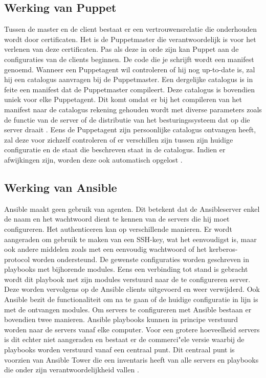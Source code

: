  \autocite{languagePuppet}\autocite{masterproef} \autocite{ansibledoc}

\subsection{Werking van Puppet}

Tussen de master en de client bestaat er een vertrouwensrelatie die onderhouden wordt door certificaten. Het is de Puppetmaster die verantwoordelijk is voor het verlenen van deze certificaten. Pas als deze in orde zijn kan Puppet  aan de configuraties van de clients beginnen. De code die je schrijft wordt een manifest genoemd. Wanneer een Puppetagent wil controleren of hij nog up-to-date is, zal hij een catalogus aanvragen bij de Puppetmaster. Een dergelijke catalogus is in feite een manifest dat de Puppetmaster compileert. Deze catalogus is bovendien uniek voor elke Puppetagent. Dit komt omdat er bij het compileren van het manifest naar de catalogus rekening gehouden wordt met diverse parameters zoals de functie van de server of de distributie van het besturingssysteem dat op die server draait \autocite{Puppetlanguagecatalog}. Eens de Puppetagent zijn persoonlijke catalogus ontvangen heeft, zal deze voor zichzelf controleren of er verschillen zijn tussen zijn huidige configuratie en de staat die beschreven staat in de catalogus. Indien er afwijkingen zijn, worden deze ook automatisch opgelost \autocite{Puppetdoc}.

\subsection{Werking van Ansible}

Ansible maakt geen gebruik van agenten. Dit betekent dat de Ansibleserver enkel de naam en het wachtwoord dient te kennen van de servers die hij moet configureren. Het authenticeren kan op verschillende manieren. Er wordt aangeraden om gebruik te maken van een SSH-key, wat het eenvoudigst is, maar ook andere middelen zoals met een eenvoudig wachtwoord of het kerberos-protocol worden ondersteund. De gewenste configuraties worden geschreven in playbooks met bijhorende modules. Eens een verbinding tot stand is gebracht wordt dit playbook met zijn modules verstuurd naar de te configureren server. Deze worden vervolgens op de Ansible clients uitgevoerd  en weer verwijderd. Ook Ansible bezit de functionaliteit om na te gaan of de huidige configuratie in lijn is met de ontvangen modules. Om servers te configureren met Ansible bestaan er bovendien twee manieren. Ansible playbooks kunnen in principe verstuurd worden naar de servers vanaf elke computer. Voor een grotere hoeveelheid servers is dit echter niet aangeraden en bestaat er de commerci"ele versie waarbij de playbooks worden verstuurd vanaf een centraal punt. Dit centraal punt is voorzien van Ansible Tower die een inventaris heeft van alle servers en playbooks die onder zijn verantwoordelijkheid vallen \autocite{ansibledoc}.


